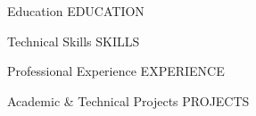 \documentclass{resume}
\begin{document}
\introduction[
    fullname={{{NAME}}},
    email={{{EMAIL_DISPLAY}}},
    phone={{{PHONE}}},
    linkedin={{{LINKEDIN_DISPLAY}}},
    github={{{GITHUB_DISPLAY}}}
]


\begin{educationSection}{Education}
{{EDUCATION}}
\end{educationSection}

\begin{skillsSection}{Technical Skills}
{{SKILLS}}
\end{skillsSection}

\begin{experienceSection}{Professional Experience}
{{EXPERIENCE}}
\end{experienceSection}

\begin{experienceSection}{Academic \& Technical Projects}
{{PROJECTS}}
\end{experienceSection}
\end{document}
